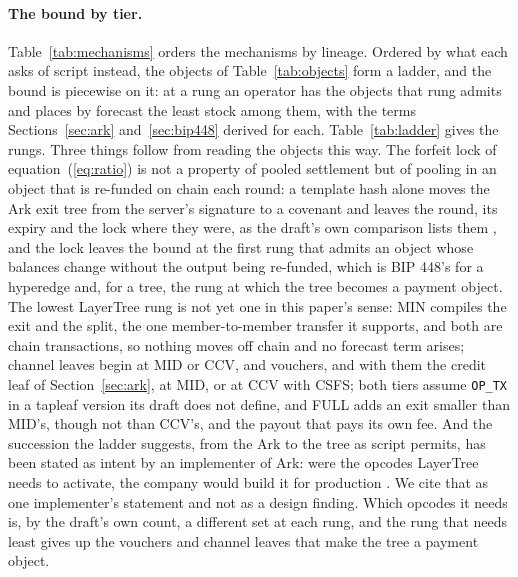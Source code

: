 \documentclass[11pt]{article}
\theoremstyle{plain}
\theoremstyle{definition}
\theoremstyle{remark}
\begin{document}
\paragraph{The bound by tier.} Table~\ref{tab:mechanisms} orders the mechanisms by lineage. Ordered by what each asks of script instead, the objects of Table~\ref{tab:objects} form a ladder, and the bound is piecewise on it: at a rung an operator has the objects that rung admits and places by forecast the least stock among them, with the terms Sections~\ref{sec:ark} and~\ref{sec:bip448} derived for each. Table~\ref{tab:ladder} gives the rungs. Three things follow from reading the objects this way. The forfeit lock of equation~(\ref{eq:ratio}) is not a property of pooled settlement but of pooling in an object that is re-funded on chain each round: a template hash alone moves the Ark exit tree from the server's signature to a covenant and leaves the round, its expiry and the lock where they were, as the draft's own comparison lists them \citep[Table 12]{osuntokun2026layertree}, and the lock leaves the bound at the first rung that admits an object whose balances change without the output being re-funded, which is BIP 448's for a hyperedge and, for a tree, the rung at which the tree becomes a payment object. The lowest LayerTree rung is not yet one in this paper's sense: MIN compiles the exit and the split, the one member-to-member transfer it supports, and both are chain transactions, so nothing moves off chain and no forecast term arises; channel leaves begin at MID or CCV, and vouchers, and with them the credit leaf of Section~\ref{sec:ark}, at MID, or at CCV with CSFS; both tiers assume \texttt{OP\_TX} in a tapleaf version its draft does not define, and FULL adds an exit smaller than MID's, though not than CCV's, and the payout that pays its own fee. And the succession the ladder suggests, from the Ark to the tree as script permits, has been stated as intent by an implementer of Ark: were the opcodes LayerTree needs to activate, the company would build it for production \citep{roose2026third}. We cite that as one implementer's statement and not as a design finding. Which opcodes it needs is, by the draft's own count, a different set at each rung, and the rung that needs least gives up the vouchers and channel leaves that make the tree a payment object.
\end{document}
